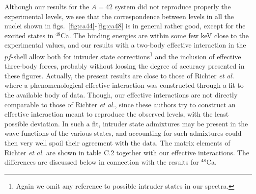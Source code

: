 Although our results for the $A=42$ system did not reproduce
properly the experimental levels, we see that the
correspondence between levels in all the nuclei
shown in figs.\ \ref{fig:ca44}-\ref{fig:ca48} is
in general rather good, except for the excited states
in $^{48}$Ca. The binding energies are within some few keV close to
the experimental values, and our results with a two-body
effective interaction in the $pf$-shell
allow both for intruder state corrections\footnote{Again
we omit any reference to possible intruder states in our spectra.}
and the inclusion
of effective three-body forces, probably without loosing
the degree of accuracy presented in these figures. Actually, the
present results are close to those of Richter {\em et al.}
\cite{richt91} where a phenomenological effective interaction
was constructed through a fit to the available body of data.
Though, our effective interactions are not directly
comparable to those of Richter {\em et al.}, since these authors
try to construct an effective interaction meant to reproduce
the observed levels,
with the least possible deviation. In
such a fit, intruder state admixtures may be present
in the wave functions of the various states, and
accounting for such admixtures could then very well spoil their
agreement with the data. 
The matrix elements of Richter {\em et al.} \cite{richt91} are
shown in table C.2 together with our effective interactions. The differences
are discussed below in connection with the results for $^{48}$Ca.

